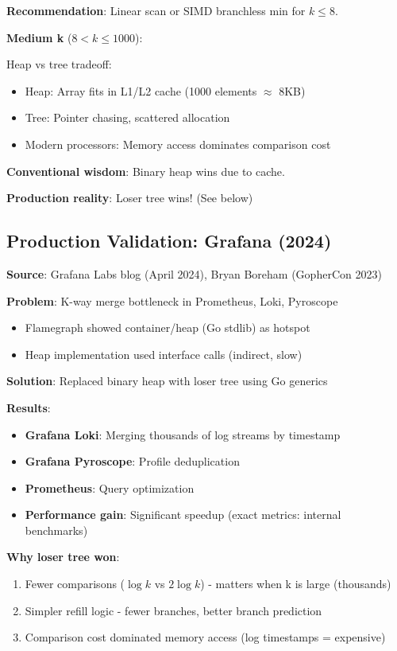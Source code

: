 \documentclass[11pt]{article}
\begin{document}
\textbf{Recommendation}: Linear scan or SIMD branchless min for $k \leq 8$.

\textbf{Medium k} ($8 < k \leq 1000$):

Heap vs tree tradeoff:
\begin{itemize}
    \item Heap: Array fits in L1/L2 cache (1000 elements $\approx$ 8KB)
    \item Tree: Pointer chasing, scattered allocation
    \item Modern processors: Memory access dominates comparison cost
\end{itemize}

\textbf{Conventional wisdom}: Binary heap wins due to cache.

\textbf{Production reality}: Loser tree wins! (See below)

\subsection{Production Validation: Grafana (2024)}

\textbf{Source}: Grafana Labs blog (April 2024), Bryan Boreham (GopherCon 2023)

\textbf{Problem}: K-way merge bottleneck in Prometheus, Loki, Pyroscope
\begin{itemize}
    \item Flamegraph showed container/heap (Go stdlib) as hotspot
    \item Heap implementation used interface calls (indirect, slow)
\end{itemize}

\textbf{Solution}: Replaced binary heap with loser tree using Go generics

\textbf{Results}:
\begin{itemize}
    \item \textbf{Grafana Loki}: Merging thousands of log streams by timestamp
    \item \textbf{Grafana Pyroscope}: Profile deduplication
    \item \textbf{Prometheus}: Query optimization
    \item \textbf{Performance gain}: Significant speedup (exact metrics: internal benchmarks)
\end{itemize}

\textbf{Why loser tree won}:
\begin{enumerate}
    \item Fewer comparisons ($\log k$ vs $2 \log k$) - matters when k is large (thousands)
    \item Simpler refill logic - fewer branches, better branch prediction
    \item Comparison cost dominated memory access (log timestamps = expensive)
\end{enumerate}
\end{document}
